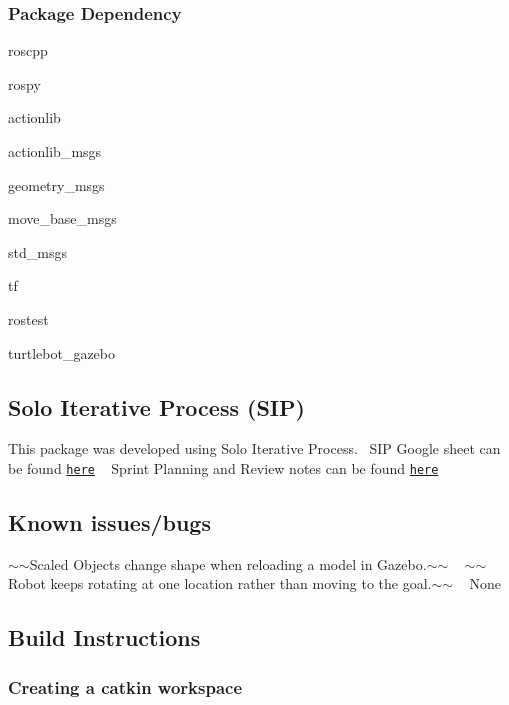  \subsubsection*{Package Dependency}


\begin{DoxyItemize}
\item roscpp
\item rospy
\item actionlib
\item actionlib\+\_\+msgs
\item geometry\+\_\+msgs
\item move\+\_\+base\+\_\+msgs
\item std\+\_\+msgs
\item tf
\item rostest
\item turtlebot\+\_\+gazebo
\end{DoxyItemize}

\subsection*{Solo Iterative Process (S\+IP)}

This package was developed using Solo Iterative Process.~\newline
 S\+IP Google sheet can be found \href{https://docs.google.com/spreadsheets/d/1xJOBrPESNhSnJeYWHMUa0bzHvRnpLpRPEiKgT72gR60/edit?usp=sharing}{\tt here} ~\newline
 Sprint Planning and Review notes can be found \href{https://docs.google.com/document/d/1MplUpR0tAjvwMJLPFIJioawKSmGYAsTr-fAWhTBEiD0/edit?usp=sharing}{\tt here}

\subsection*{Known issues/bugs}

$\sim$$\sim$\+Scaled Objects change shape when reloading a model in Gazebo.$\sim$$\sim$ ~\newline
 $\sim$$\sim$\+Robot keeps rotating at one location rather than moving to the goal.$\sim$$\sim$ ~\newline
 None

\subsection*{Build Instructions}

\subsubsection*{Creating a catkin workspace}

